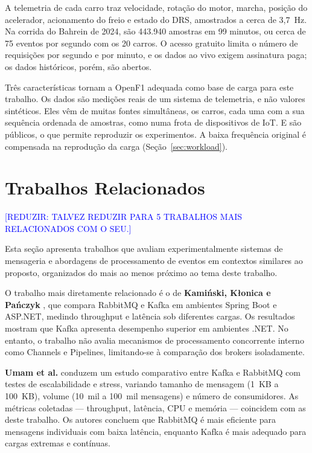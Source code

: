 \documentclass[12pt]{article}
\newcommand{\todoe}[1]{\textcolor{blue}{[#1]}}
\begin{document}
A telemetria de cada carro traz velocidade, rotação do motor, marcha, posição do
acelerador, acionamento do freio e estado do DRS, amostrados a cerca de 3,7~Hz. Na corrida
do Bahrein de 2024, são 443.940 amostras em 99 minutos, ou cerca de 75 eventos por segundo
com os 20 carros. O acesso gratuito limita o número de requisições por segundo e por
minuto, e os dados ao vivo exigem assinatura paga; os dados históricos, porém, são
abertos.

Três características tornam a OpenF1 adequada como base de carga para este trabalho. Os
dados são medições reais de um sistema de telemetria, e não valores sintéticos. Eles vêm
de muitas fontes simultâneas, os carros, cada uma com a sua sequência ordenada de
amostras, como numa frota de dispositivos de IoT. E são públicos, o que permite
reproduzir os experimentos. A baixa frequência original é compensada na reprodução da
carga (Seção~\ref{sec:workload}).


\section{Trabalhos Relacionados}
\label{sec:relacionados}

\todoe{REDUZIR: TALVEZ REDUZIR PARA 5 TRABALHOS MAIS RELACIONADOS COM O SEU.}

Esta seção apresenta trabalhos que avaliam experimentalmente sistemas de mensageria e
abordagens de processamento de eventos em contextos similares ao proposto, organizados do
mais ao menos próximo ao tema deste trabalho.

O trabalho mais diretamente relacionado é o de \textbf{Kamiński, Kłonica e Pańczyk}
\cite{kaminski:2025}, que compara RabbitMQ e Kafka em ambientes Spring Boot e ASP.NET,
medindo throughput e latência sob diferentes cargas. Os resultados mostram que Kafka
apresenta desempenho superior em ambientes .NET. No entanto, o trabalho não avalia
mecanismos de processamento concorrente interno como Channels e Pipelines, limitando-se à
comparação dos brokers isoladamente.

\textbf{Umam et al.} \cite{umam:2026} conduzem um estudo comparativo entre Kafka e
RabbitMQ com testes de escalabilidade e stress, variando tamanho de mensagem (1~KB a
100~KB), volume (10~mil a 100~mil mensagens) e número de consumidores. As métricas
coletadas — throughput, latência, CPU e memória — coincidem com as deste trabalho. Os
autores concluem que RabbitMQ é mais eficiente para mensagens individuais com baixa
latência, enquanto Kafka é mais adequado para cargas extremas e contínuas.
\end{document}

